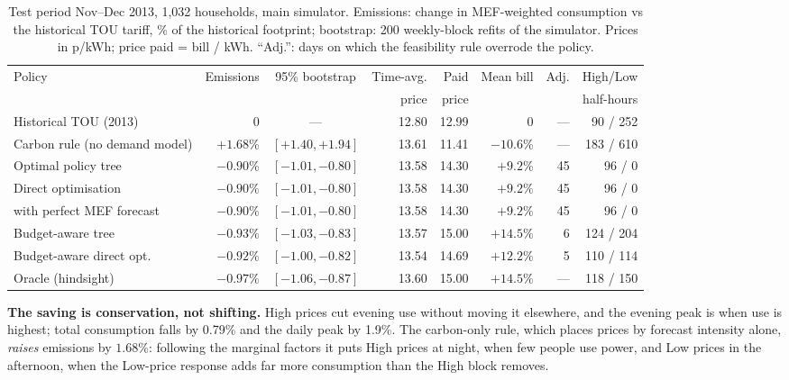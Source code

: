 \documentclass[11pt]{article}
\newcommand{\pct}[1]{$#1\%$}
\begin{document}
\begin{table}[t]
\centering\small
\caption{Test period Nov--Dec 2013, 1,032 households, main simulator. Emissions: change in MEF-weighted consumption vs
the historical TOU tariff, \% of the historical footprint; bootstrap: 200 weekly-block refits of the simulator. Prices
in p/kWh; price paid = bill / kWh. ``Adj.'': days on which the feasibility rule overrode the policy.}
\label{tab:main}
\begin{adjustbox}{max width=\textwidth}
\begin{tabular}{lrcrrrrr}
\toprule
Policy & Emissions & 95\% bootstrap & Time-avg. & Paid & Mean bill & Adj. & High/Low \\
 & & & price & price & & & half-hours \\
\midrule
Historical TOU (2013) & 0 & --- & 12.80 & 12.99 & 0 & --- & 90 / 252 \\
Carbon rule (no demand model) & $+1.68\%$ & $[+1.40, +1.94]$ & 13.61 & 11.41 & $-10.6\%$ & --- & 183 / 610 \\
Optimal policy tree & $-0.90\%$ & $[-1.01, -0.80]$ & 13.58 & 14.30 & $+9.2\%$ & 45 & 96 / 0 \\
Direct optimisation & $-0.90\%$ & $[-1.01, -0.80]$ & 13.58 & 14.30 & $+9.2\%$ & 45 & 96 / 0 \\
\quad with perfect MEF forecast & $-0.90\%$ & $[-1.01, -0.80]$ & 13.58 & 14.30 & $+9.2\%$ & 45 & 96 / 0 \\
Budget-aware tree & $-0.93\%$ & $[-1.03, -0.83]$ & 13.57 & 15.00 & $+14.5\%$ & 6 & 124 / 204 \\
Budget-aware direct opt. & $-0.92\%$ & $[-1.00, -0.82]$ & 13.54 & 14.69 & $+12.2\%$ & 5 & 110 / 114 \\
Oracle (hindsight) & $-0.97\%$ & $[-1.06, -0.87]$ & 13.60 & 15.00 & $+14.5\%$ & --- & 118 / 150 \\
\bottomrule
\end{tabular}
\end{adjustbox}
\end{table}

\textbf{The saving is conservation, not shifting.} High prices cut evening use without moving it elsewhere, and the
evening peak is when use is highest; total consumption falls by 0.79\% and the daily peak by 1.9\%. The carbon-only
rule, which places prices by forecast intensity alone, \emph{raises} emissions by \pct{1.68}: following the marginal
factors it puts High prices at night, when few people use power, and Low prices in the afternoon, when the Low-price
response adds far more consumption than the High block removes.
\end{document}
